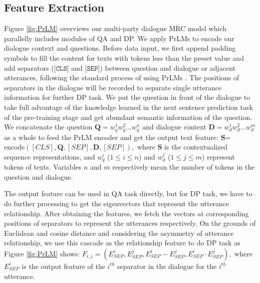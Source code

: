 \documentclass[11pt]{article}
\begin{document}
\subsection{Feature Extraction}\label{subsec:embeddings}
Figure \ref{fig:PrLM} overviews our multi-party dialogue MRC model which parallelly includes modules of QA and DP. We apply PrLMs to encode our dialogue context and questions. Before data input, we first append padding symbols to fill the content for texts with tokens less than the preset value and add separators ($\texttt{[CLS]}$ and $\texttt{[SEP]}$) between question and dialogue or adjacent utterances, following the standard process of using PrLMs \cite{devlin-etal-2019-bert}. The positions of separators in the dialogue will be recorded to separate single utterance information for further DP task. We put the question in front of the dialogue to take full advantage of the knowledge learned in the next sentence prediction task of the pre-training stage and get abundant semantic information of the question. We concatenate the question $\boldsymbol{Q}=w_q^1w_q^2...w_q^n$ and dialogue context $\boldsymbol{D}=w_d^1w_d^2...w_d^m$ as a whole to feed the PrLM encoder and get the output text feature:
$
\boldsymbol{S}$=$\textrm{encode}([CLS],\boldsymbol{Q},[SEP],\boldsymbol{D},[SEP]),
$
where $\boldsymbol{S}$ is the contextualized sequence representations, and $w_q^i$ ($1\leq i\leq n$) and $w_d^j$ ($1\leq j\leq m$) represent tokens of texts. Variables $n$ and $m$ respectively mean the number of tokens in the question and dialogue. 

The output feature can be used in QA task directly, but for DP task, we have to do further processing to get the eigenvectors that represent the utterance relationship. After obtaining the features, we fetch the vectors at corresponding positions of separators to represent the utterances respectively. On the grounds of Euclidean and cosine distance and considering the asymmetry of utterance relationship, we use this cascade as the relationship feature to do DP task as Figure \ref{fig:PrLM} shows:
$
F_{i,j}= (E_{SEP}^i, E_{SEP}^j, E_{SEP}^i-E_{SEP}^j, E_{SEP}^i\cdot E_{SEP}^j),
$
where $E_{SEP}^i$ is the output feature of the $i^{th}$ separator in the dialogue for the $i^{th}$ utterance.
\end{document}
